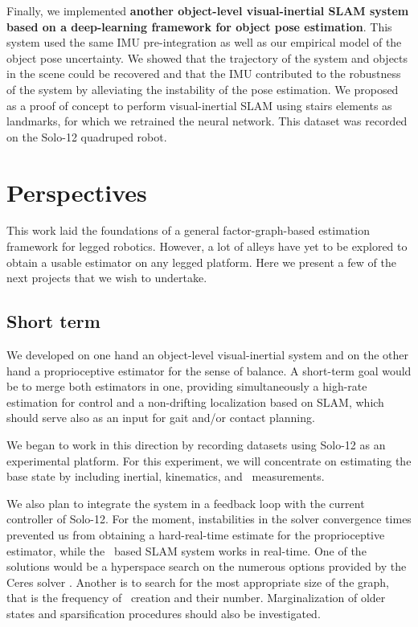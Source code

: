 Finally, we implemented \textbf{another object-level visual-inertial SLAM system based on a deep-learning framework for object pose estimation}. This system  used the same 
IMU pre-integration as well as our empirical model of the object pose uncertainty. We showed that the trajectory of the system and objects
in the scene could be recovered and that the IMU contributed to the robustness of the system by alleviating the instability of the pose estimation. We proposed
as a proof of concept to perform visual-inertial SLAM using stairs elements as landmarks, for which we retrained the neural network. This dataset was recorded on the Solo-12 quadruped robot.


\section{Perspectives}
This work laid the foundations of a general factor-graph-based estimation framework for legged robotics. However, a lot of alleys have yet to be explored 
to obtain a usable estimator on any legged platform. Here we present a few of the next projects that we wish to undertake.

\subsection{Short term}
We developed on one hand an object-level visual-inertial system and on the other hand a proprioceptive estimator for the sense of balance. A short-term goal
would be to merge both estimators in one, providing simultaneously a high-rate estimation for control and a non-drifting localization based on SLAM, which should serve also as an input for gait and/or contact planning. 

We began to work in this direction by recording datasets using Solo-12 as an experimental platform. For this experiment, we will concentrate on estimating the 
base state by including inertial, kinematics, and \apriltag\ measurements. 

We also plan to integrate the system in a feedback loop with the current controller of Solo-12. For the moment, instabilities in the solver convergence times prevented
us from obtaining a hard-real-time estimate for the proprioceptive estimator, while the \apriltag\ based SLAM system works in real-time. One of the solutions would 
be a hyperspace search on the numerous options provided by the Ceres solver \cite{ceres-solver}. Another is to search for the most appropriate size of the graph,
that is the frequency of \keyframe\ creation and their number. Marginalization of older states and sparsification procedures should also be investigated.



